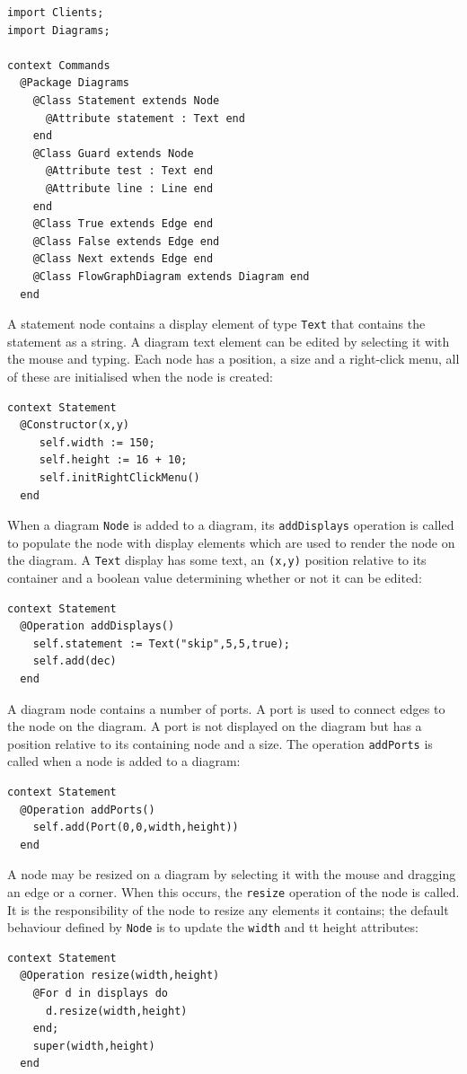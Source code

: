 \documentclass{article}
\begin{document}
\begin{verbatim}
import Clients;
import Diagrams;

context Commands
  @Package Diagrams
    @Class Statement extends Node 
      @Attribute statement : Text end
    end
    @Class Guard extends Node 
      @Attribute test : Text end
      @Attribute line : Line end
    end
    @Class True extends Edge end
    @Class False extends Edge end
    @Class Next extends Edge end
    @Class FlowGraphDiagram extends Diagram end
  end
\end{verbatim}
A statement node contains a display element of type {\tt Text} that contains
the statement as a string. A diagram text element can be edited by selecting it 
with the mouse and typing. Each node has a position, a size and a right-click
menu, all of these are initialised when the node is created:
\begin{verbatim}
context Statement
  @Constructor(x,y)
     self.width := 150;
     self.height := 16 + 10;
     self.initRightClickMenu()
  end
\end{verbatim}
When a diagram {\tt Node} is added to a diagram, its {\tt addDisplays} operation 
is called to populate the node with display elements which are used to render the
node on the diagram. A {\tt Text} display has some text, an {\tt (x,y)} position
relative to its container and a boolean value determining whether or not it can be 
edited:
\begin{verbatim}
context Statement
  @Operation addDisplays()
    self.statement := Text("skip",5,5,true);
    self.add(dec)
  end
\end{verbatim} 
A diagram node contains a number of ports. A port is used to connect edges to the node
on the diagram. A port is not displayed on the diagram but has a position relative to
its containing node and a size. The operation {\tt addPorts} is called when a node
is added to a diagram:
\begin{verbatim}
context Statement
  @Operation addPorts()
    self.add(Port(0,0,width,height))
  end
\end{verbatim}
A node may be resized on a diagram by selecting it with the mouse and dragging an 
edge or a corner. When this occurs, the {\tt resize} operation of the node is
called. It is the responsibility of the node to resize any elements it contains;
the default behaviour defined by {\tt Node} is to update the {\tt width} and {tt height}
attributes:
\begin{verbatim}
context Statement
  @Operation resize(width,height)
    @For d in displays do
      d.resize(width,height)
    end;
    super(width,height)
  end
\end{verbatim}
\end{document}
